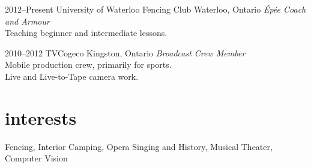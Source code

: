 \documentclass[]{eliot-cv} %
\begin{document}
\begin{entrylist}

\entry
{2012--Present}
{University of Waterloo Fencing Club}
{Waterloo, Ontario}
{\emph{\'{E}p\'{e}e Coach and Armour} \\
Teaching beginner and intermediate lessons. \\}

\entry
{2010--2012}
{TVCogeco}
{Kingston, Ontario}
{\emph{Broadcast Crew Member} \\
Mobile production crew, primarily for sports. \\
Live and Live-to-Tape camera work.}
\end{entrylist}


\section{interests}

Fencing, Interior Camping, Opera Singing and History, Musical Theater, Computer Vision
\end{document}
